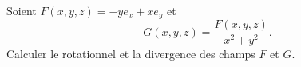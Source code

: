 
\begin{exercice}\label{exoOutilsMath-0065}

    Soient $F(x,y,z)=-ye_x+x e_y$ et
    \begin{equation}
        G(x,y,z)=\frac{ F(x,y,z) }{ x^2+y^2 }.
    \end{equation}
    Calculer le rotationnel et la divergence des champs $F$ et $G$.

\end{exercice}
